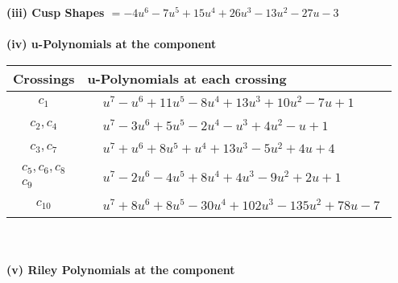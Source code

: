 \documentclass[1p]{elsarticle_modified}
\theoremstyle{definition}
\begin{document}
\flushleft \textbf{(iii) Cusp Shapes $= -4 u^6-7 u^5+15 u^4+26 u^3-13 u^2-27 u-3$}\\~\\
\newpage\renewcommand{\arraystretch}{1}
\flushleft \textbf{(iv) u-Polynomials at the component}\newline \\
\begin{tabular}{m{50pt}|m{274pt}}
Crossings & \hspace{64pt}u-Polynomials at each crossing \\
\hline $$\begin{aligned}c_{1}\end{aligned}$$&$\begin{aligned}
&u^7- u^6+11 u^5-8 u^4+13 u^3+10 u^2-7 u+1
\end{aligned}$\\
\hline $$\begin{aligned}c_{2},c_{4}\end{aligned}$$&$\begin{aligned}
&u^7-3 u^6+5 u^5-2 u^4- u^3+4 u^2- u+1
\end{aligned}$\\
\hline $$\begin{aligned}c_{3},c_{7}\end{aligned}$$&$\begin{aligned}
&u^7+u^6+8 u^5+u^4+13 u^3-5 u^2+4 u+4
\end{aligned}$\\
\hline $$\begin{aligned}c_{5},c_{6},c_{8}\\c_{9}\end{aligned}$$&$\begin{aligned}
&u^7-2 u^6-4 u^5+8 u^4+4 u^3-9 u^2+2 u+1
\end{aligned}$\\
\hline $$\begin{aligned}c_{10}\end{aligned}$$&$\begin{aligned}
&u^7+8 u^6+8 u^5-30 u^4+102 u^3-135 u^2+78 u-7
\end{aligned}$\\
\hline
\end{tabular}\\~\\
\newpage\renewcommand{\arraystretch}{1}
\flushleft \textbf{(v) Riley Polynomials at the component}\newline \\
\end{document}
